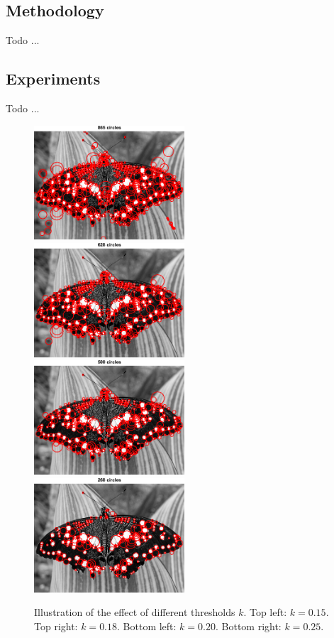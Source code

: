 \documentclass[a4paper,psfig,subfigure,epsfig,fleqn,ausarbeitung,amssmb,float,caption,fontenc]{article}
\begin{document}
\subsection{Methodology}

Todo ...

\subsection{Experiments}

Todo ...

\begin{figure}[h]
	\includegraphics[width=0.5\textwidth]{figures/a3_butterfly_k015.png}
	\includegraphics[width=0.5\textwidth]{figures/a3_butterfly_k018.png}
	\includegraphics[width=0.5\textwidth]{figures/a3_butterfly_k020.png}
	\includegraphics[width=0.5\textwidth]{figures/a3_butterfly_k025.png}
	\caption{Illustration of the effect of different thresholds $k$. Top left: $k=0.15$. Top right: $k=0.18$. Bottom left: $k=0.20$. Bottom right: $k=0.25$.}
	\label{fig:a3:thresholds}
\end{figure}
\end{document}
